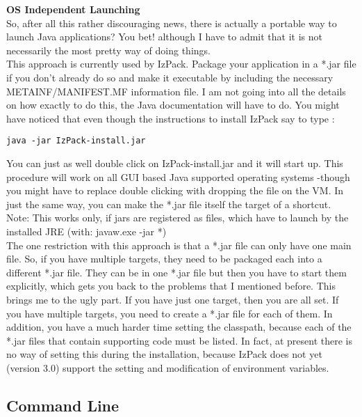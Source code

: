 \textbf{OS Independent Launching}\\

So, after all this rather discouraging news, there is actually a
portable way to launch Java applications? You bet! although I have to
admit that it is not necessarily the most pretty way of doing things.\\

This approach is currently used by IzPack. Package your application in a
*.jar file if you don't already do so and make it executable by including the
necessary METAINF/MANIFEST.MF information file. I am not
going into all the details on how exactly to do this, the Java
documentation will have to do. You might have noticed that even though
the instructions to install IzPack say to type :
\begin{verbatim}
java -jar IzPack-install.jar
\end{verbatim}

You can just as well double click on IzPack-install.jar and it will
start up. This procedure will work on all GUI based Java supported operating
systems -though you might have to replace double clicking with dropping
the file on the VM. In just the same way, you can make the *.jar file
itself the target of a shortcut. Note: This works only, if jars are registered
as files, which have to launch by the installed JRE (with: javaw.exe -jar *)\\

The one restriction with this approach is that a *.jar file can only have
one main file. So, if you have multiple targets, they need to be
packaged each into a different *.jar file. They can be in one *.jar file
but then you have to start them explicitly, which gets you back to the
problems that I mentioned before. This brings me to the ugly part. If
you have just one target, then you are all set. If you have multiple
targets, you need to create a *.jar file for each of them. In addition,
you have a much harder time setting the classpath, because each of the
*.jar files that contain supporting code must be listed. In fact, at
present there is no way of setting this during the installation, because
IzPack does not yet (version 3.0) support the setting and modification
of environment variables.\\

\subsection{Command Line}

